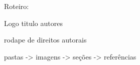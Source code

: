 Roteiro:

Logo
titulo 
autores 

rodape de direitos autorais 

pastas
-> imagens 
-> seções
-> referências 
